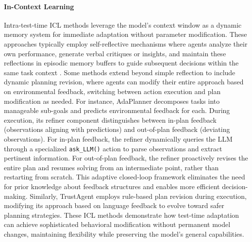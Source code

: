 \paragraph{In-Context Learning} Intra-test-time ICL methods leverage the model's context window as a dynamic memory system for immediate adaptation without parameter modification. These approaches typically employ self-reflective mechanisms where agents analyze their own performance, generate verbal critiques or insights, and maintain these reflections in episodic memory buffers to guide subsequent decisions within the same task context \citep{shinn2023reflexion, madaan2023self_refine}. Some methods extend beyond simple reflection to include dynamic planning revision, where agents can modify their entire approach based on environmental feedback, switching between action execution and plan modification as needed. For instance, AdaPlanner \citep{sun2023adaplanner} decomposes tasks into manageable sub-goals and predicts environmental feedback for each. During execution, its refiner component distinguishes between in-plan feedback (observations aligning with predictions) and out-of-plan feedback (deviating observations). For in-plan feedback, the refiner dynamically queries the LLM through a specialized \texttt{ask\_LLM()} action to parse observations and extract pertinent information. For out-of-plan feedback, the refiner proactively revises the entire plan and resumes solving from an intermediate point, rather than restarting from scratch. This adaptive closed-loop framework eliminates the need for prior knowledge about feedback structures and enables more efficient decision-making. Similarly, TrustAgent \citep{hua2024trustagent} employs rule-based plan revision during execution, modifying its approach based on language feedback to evolve toward safer planning strategies. These ICL methods demonstrate how test-time adaptation can achieve sophisticated behavioral modification without permanent model changes, maintaining flexibility while preserving the model's general capabilities.

